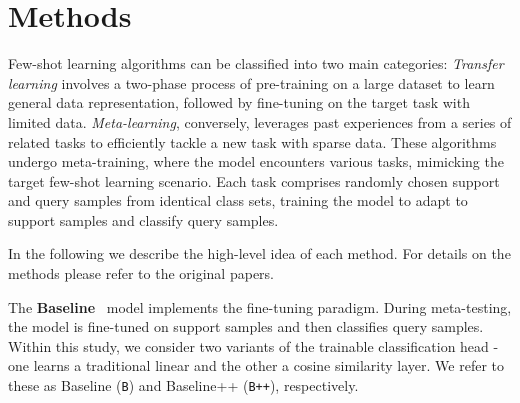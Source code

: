 \section{Methods}


Few-shot learning algorithms can be classified into two main categories: \textit{Transfer learning} involves a two-phase process of pre-training on a large dataset to learn general data representation, followed by fine-tuning on the target task with limited data. \textit{Meta-learning}, conversely, leverages past experiences from a series of related tasks to efficiently tackle a new task with sparse data. These algorithms undergo meta-training, where the model encounters various tasks, mimicking the target few-shot learning scenario. Each task comprises randomly chosen support and query samples from identical class sets, training the model to adapt to support samples and classify query samples.

In the following we describe the high-level idea of each method. For details on the methods please refer to the original papers.

% 
% 
% 


The \textbf{Baseline}~\cite{baseline} model implements the fine-tuning paradigm. During meta-testing, the model is fine-tuned on support samples and then classifies query samples. Within this study, we consider two variants of the trainable classification head - one learns a traditional linear and the other a cosine similarity layer. We refer to these as Baseline (\texttt{B}) and Baseline++ (\texttt{B++}), respectively.

